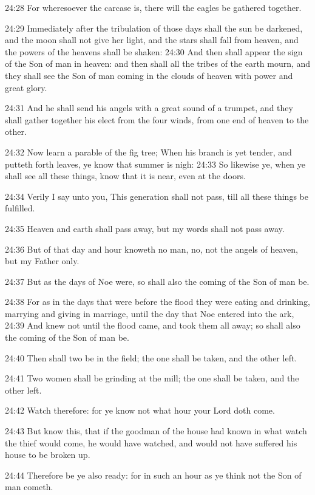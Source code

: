 24:28 For wheresoever the carcase is, there will the eagles be
gathered together.

24:29 Immediately after the tribulation of those days shall the sun be
darkened, and the moon shall not give her light, and the stars shall
fall from heaven, and the powers of the heavens shall be shaken: 24:30
And then shall appear the sign of the Son of man in heaven: and then
shall all the tribes of the earth mourn, and they shall see the Son of
man coming in the clouds of heaven with power and great glory.

24:31 And he shall send his angels with a great sound of a trumpet,
and they shall gather together his elect from the four winds, from one
end of heaven to the other.

24:32 Now learn a parable of the fig tree; When his branch is yet
tender, and putteth forth leaves, ye know that summer is nigh: 24:33
So likewise ye, when ye shall see all these things, know that it is
near, even at the doors.

24:34 Verily I say unto you, This generation shall not pass, till all
these things be fulfilled.

24:35 Heaven and earth shall pass away, but my words shall not pass
away.

24:36 But of that day and hour knoweth no man, no, not the angels of
heaven, but my Father only.

24:37 But as the days of Noe were, so shall also the coming of the Son
of man be.

24:38 For as in the days that were before the flood they were eating
and drinking, marrying and giving in marriage, until the day that Noe
entered into the ark, 24:39 And knew not until the flood came, and
took them all away; so shall also the coming of the Son of man be.

24:40 Then shall two be in the field; the one shall be taken, and the
other left.

24:41 Two women shall be grinding at the mill; the one shall be taken,
and the other left.

24:42 Watch therefore: for ye know not what hour your Lord doth come.

24:43 But know this, that if the goodman of the house had known in
what watch the thief would come, he would have watched, and would not
have suffered his house to be broken up.

24:44 Therefore be ye also ready: for in such an hour as ye think not
the Son of man cometh.

